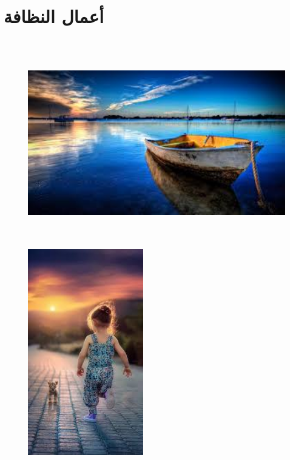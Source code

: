 \documentclass{article}
\begin{document}
\section{أعمال النظافة}
\begin{figure}[H]
    \centering

    \begin{minipage}{0.45\textwidth}
        \centering
        \includegraphics[height=9cm,width=\textwidth]{cleaning/1.jpg}
    \end{minipage}
    \hfill
    \begin{minipage}{0.45\textwidth}
        \centering
        \includegraphics[height=9cm,width=\textwidth]{cleaning/2.jpg}
    \end{minipage}
    \vspace{0.5cm} %


\end{figure}
\end{document}
